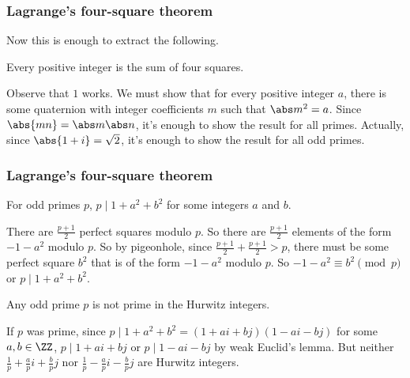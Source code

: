 \documentclass{beamer}
\begin{document}
\begin{frame}
	\frametitle{Lagrange's four-square theorem}
	Now this is enough to extract the following.

	\begin{theorem}
		Every positive integer is the sum of four squares.
	\end{theorem}

	\begin{itemize}
		\ii Observe that $1$ works.
		\ii We must show that for every positive integer $a$, there is some quaternion with integer coefficients $m$ such that $\abs m^2 = a$.
		\ii Since $\abs{mn} = \abs m\abs n$, it's enough to show the result for all primes.
		\ii Actually, since $\abs{1 + i} = \sqrt 2$, it's enough to show the result for all odd primes.
	\end{itemize}
\end{frame}

\begin{frame}
	\frametitle{Lagrange's four-square theorem}
	\begin{lemma}
		For odd primes $p$, $p \mid 1 + a^2 + b^2$ for some integers $a$ and $b$.
	\end{lemma}

	\begin{itemize}
		\ii There are $\frac{p + 1}2$ perfect squares modulo $p$.
		\ii So there are $\frac{p + 1}2$ elements of the form $-1 - a^2$ modulo $p$.
		\ii So by pigeonhole, since $\frac{p + 1}2 + \frac{p + 1}2 > p$, there must be some perfect square $b^2$ that is of the form $-1 - a^2$ modulo $p$.
		\ii So $-1 - a^2 \equiv b^2 \pmod p$ or $p \mid 1 + a^2 + b^2$.
	\end{itemize}

	\begin{lemma}
		Any odd prime $p$ is \alert{not} prime in the Hurwitz integers.
	\end{lemma}

	\begin{itemize}
		\ii If $p$ was prime, since $p \mid 1 + a^2 + b^2 = (1 + ai + bj)(1 - ai - bj)$ for some $a,b \in \ZZ$, $p \mid 1 + ai + bj$ or $p \mid 1 - ai - bj$ by weak Euclid's lemma.
		\ii But neither $\frac 1p + \frac api + \frac bpj$ nor $\frac 1p - \frac api - \frac bpj$ are Hurwitz integers.
	\end{itemize}
\end{frame}
\end{document}
